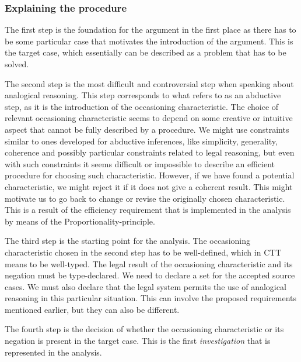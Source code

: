 		\subsubsection{Explaining the procedure}

		The first step is the foundation for the argument in the first place as there has to be some particular case that motivates the introduction of the argument. This is the target case, which essentially can be described as a problem that has to be solved. 
		
		The second step is the most difficult and controversial step when speaking about analogical reasoning. This step corresponds to what \textcite{Brewer1996} refers to as an abductive step, as it is the introduction of the occasioning characteristic. The choice of relevant occasioning characteristic seems to depend on some creative or intuitive aspect that cannot be fully described by a procedure. We might use constraints similar to ones developed for abductive inferences, like simplicity, generality, coherence and possibly particular constraints related to legal reasoning, but even with such constraints it seems difficult or impossible to describe an efficient procedure for choosing such characteristic. However, if we have found a potential characteristic, we might reject it if it does not give a coherent result. This might motivate us to go back to change or revise the originally chosen characteristic. This is a result of the efficiency requirement that is implemented in the analysis by means of the Proportionality-principle.
		
		The third step is the starting point for the analysis. The occasioning characteristic chosen in the second step has to be well-defined, which in CTT means to be well-typed. The legal result of the occasioning characteristic and its negation must be type-declared. We need to declare a set for the accepted source cases. We must also declare that the legal system permits the use of analogical reasoning in this particular situation. This can involve the proposed requirements mentioned earlier, but they can also be different. 
		
		The fourth step is the decision of whether the occasioning characteristic or its negation is present in the target case. This is the first \textit{investigation} that is represented in the analysis. 
		
